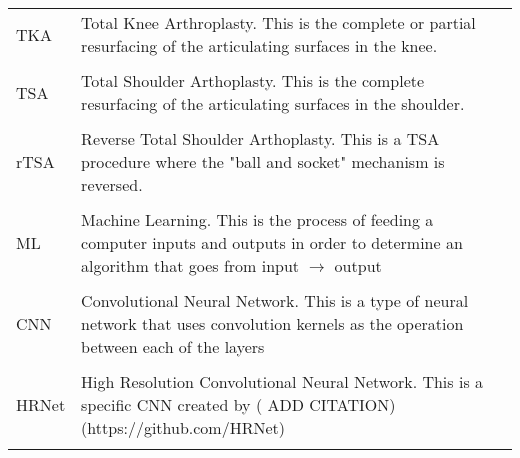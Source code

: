 \singlespacing
\begin{tabular}{l p{5in}} 
TKA & Total Knee Arthroplasty. This is the complete or partial resurfacing of the articulating surfaces in the knee.\\
\\
TSA & Total Shoulder Arthoplasty. This is the complete resurfacing of the articulating surfaces in the shoulder.\\
\\
rTSA & Reverse Total Shoulder Arthoplasty. This is a TSA procedure where the "ball and socket" mechanism is reversed.\\
\\
ML & Machine Learning. This is the process of feeding a computer inputs and outputs in order to determine an algorithm that goes from input $\longrightarrow$ output\\
\\
CNN & Convolutional Neural Network. This is a type of neural network that uses convolution kernels as the operation between each of the layers\\
\\
HRNet & High Resolution Convolutional Neural Network. This is a specific CNN created by ({\color{red} ADD CITATION}) (https://github.com/HRNet)\\
\\
\end{tabular}

\doublespacing
